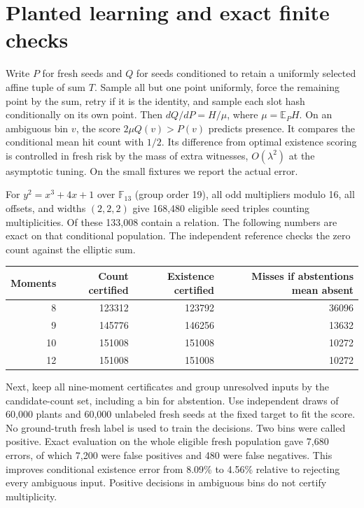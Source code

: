 \documentclass[11pt]{article}
\newcommand{\F}{\mathbb F}
\newcommand{\E}{\mathbb E}
\begin{document}
\section{Planted learning and exact finite checks}
Write $P$ for fresh seeds and $Q$ for seeds conditioned to retain a
uniformly selected affine tuple of sum $T$. Sample all but one point
uniformly, force the remaining point by the sum, retry if it is the
identity, and sample each slot hash conditionally on its own point.
Then $dQ/dP=H/\mu$, where $\mu=\E_P H$. On an ambiguous bin $v$,
the score $2\mu Q(v)>P(v)$ predicts presence. It compares the
conditional mean hit count with $1/2$. Its difference from optimal
existence scoring is controlled in fresh risk by the mass of extra
witnesses, $O(\lambda^2)$ at the asymptotic tuning. On the small
fixtures we report the actual error.

For $y^2=x^3+4x+1$ over $\F_{13}$ (group order 19), all odd multipliers
modulo 16, all offsets, and widths $(2,2,2)$ give 168,480 eligible seed
triples counting multiplicities. Of these 133,008 contain a relation.
The following numbers are exact on that conditional population. The
independent reference checks the zero count against the elliptic sum.
\begin{center}
\begin{tabular}{rrrr}
\toprule Moments & Count certified & Existence certified & Misses if abstentions mean absent\\
\midrule
8 & 123312 & 123792 & 36096\\
9 & 145776 & 146256 & 13632\\
10 & 151008 & 151008 & 10272\\
12 & 151008 & 151008 & 10272\\
\bottomrule
\end{tabular}
\end{center}
Next, keep all nine-moment certificates and group unresolved inputs by
the candidate-count set, including a bin for abstention. Use independent
draws of 60,000 plants and 60,000 unlabeled fresh seeds at the fixed
target to fit the score. No ground-truth fresh label is used to train the
decisions. Two bins were called positive. Exact evaluation on the whole
eligible fresh population gave 7,680 errors, of which 7,200 were false
positives and 480 were false negatives. This improves conditional existence
error from 8.09\% to 4.56\% relative to rejecting every ambiguous input.
Positive decisions in ambiguous bins do not certify multiplicity.
\end{document}
